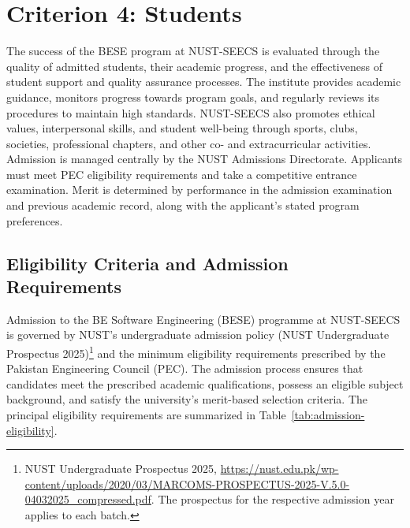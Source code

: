 
\chapter{Criterion 4: Students}
\label{criterion4}

The success of the BESE program at NUST-SEECS is evaluated through the quality of admitted students, their academic progress, and the effectiveness of student support and quality assurance processes. The institute provides academic guidance, monitors progress towards program goals, and regularly reviews its procedures to maintain high standards. NUST-SEECS also promotes ethical values, interpersonal skills, and student well-being through sports, clubs, societies, professional chapters, and other co- and extracurricular activities. Admission is managed centrally by the NUST Admissions Directorate. Applicants must meet PEC eligibility requirements and take a competitive entrance examination. Merit is determined by performance in the admission examination and previous academic record, along with the applicant's stated program preferences.

\section{Eligibility Criteria and Admission Requirements}
\label{sec:admission-criteria}

Admission to the BE Software Engineering (BESE) programme at NUST-SEECS is
governed by NUST's undergraduate admission policy
(NUST Undergraduate Prospectus 2025)\footnote{NUST Undergraduate Prospectus 2025,
\url{https://nust.edu.pk/wp-content/uploads/2020/03/MARCOMS-PROSPECTUS-2025-V.5.0-04032025_compressed.pdf}.
The prospectus for the respective admission year applies to each batch.}
and the minimum eligibility requirements prescribed by the Pakistan Engineering
Council (PEC). The admission process ensures that candidates meet the prescribed
academic qualifications, possess an eligible subject background, and satisfy the
university's merit-based selection criteria. The principal eligibility
requirements are summarized in Table~\ref{tab:admission-eligibility}.

